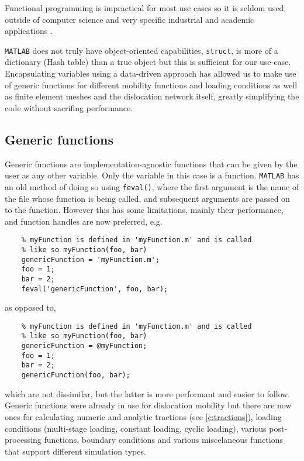Functional programming is impractical for most use cases so it is seldom used outside of computer science and very specific industrial and academic applications \cite{haskell,functionalProg}.

\texttt{MATLAB} does not truly have object-oriented capabilities, \texttt{struct}, is more of a dictionary (Hash table) than a true object but this is sufficient for our use-case. Encapsulating variables using a data-driven approach has allowed us to make use of generic functions for different mobility functions and loading conditions as well as finite element meshes and the dislocation network itself, greatly simplifying the code without sacrifing performance.

\subsection{Generic functions}

Generic functions are implementation-agnostic functions that can be given by the user as any other variable. Only the variable in this case is a function. \texttt{MATLAB} has an old method of doing so using \texttt{feval()}, where the first argument is the name of the file whose function is being called, and subsequent arguments are passed on to the function. However this has some limitations, mainly their performance, and function handles are now preferred, e.g.
\begin{verbatim}
    % myFunction is defined in 'myFunction.m' and is called 
    % like so myFunction(foo, bar)
    genericFunction = 'myFunction.m'; 
    foo = 1;
    bar = 2;
    feval('genericFunction', foo, bar);
\end{verbatim}
as opposed to,
\begin{verbatim}
    % myFunction is defined in 'myFunction.m' and is called 
    % like so myFunction(foo, bar)
    genericFunction = @myFunction; 
    foo = 1;
    bar = 2;
    genericFunction(foo, bar);
\end{verbatim}
which are not dissimilar, but the latter is more performant and easier to follow. Generic functions were already in use for dislocation mobility but there are now ones for calculating numeric and analytic tractions (see \cref{c:tractions}), loading conditions (multi-stage loading, constant loading, cyclic loading), various post-processing functions, boundary conditions and various miscelaneous functions that support different simulation types.

